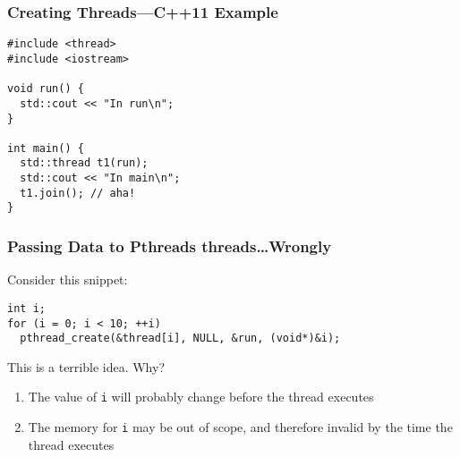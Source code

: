 \documentclass[aspectratio=43]{beamer}
\newenvironment{changemargin}[1]{%
  \begin{list}{}{%
    \setlength{\topsep}{0pt}%
    \setlength{\leftmargin}{#1}%
    \setlength{\rightmargin}{1em}
    \setlength{\listparindent}{\parindent}%
    \setlength{\itemindent}{\parindent}%
    \setlength{\parsep}{\parskip}%
  }%
  \item[]}{\end{list}}
\begin{document}
\begin{frame}[fragile]
  \frametitle{Creating Threads---C++11 Example}

  \begin{changemargin}{1.5cm}
\begin{lstlisting}
#include <thread>
#include <iostream>

void run() {
  std::cout << "In run\n";
}

int main() {
  std::thread t1(run);
  std::cout << "In main\n";
  t1.join(); // aha!
}
\end{lstlisting}
  \end{changemargin}
\end{frame}

\begin{frame}[fragile]
  \frametitle{Passing Data to Pthreads threads\ldots Wrongly}

\begin{changemargin}{1.5cm}
Consider this snippet:
\vfill
\begin{lstlisting}
int i;
for (i = 0; i < 10; ++i)
  pthread_create(&thread[i], NULL, &run, (void*)&i);
\end{lstlisting}
  \vfill
  This is a \alert{terrible} idea. Why?
  \vfill
  \begin{enumerate}
    \item<2-> The value of {\tt i} will probably change before the thread executes
    \item<2-> The memory for {\tt i} may be out of scope, and therefore invalid by
          the time the thread executes
  \end{enumerate}
\end{changemargin}

\end{frame}
\end{document}
